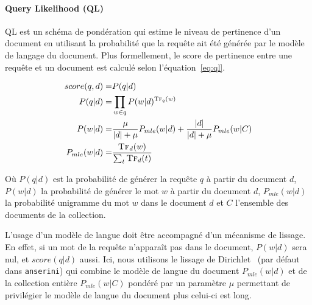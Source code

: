 \paragraph{Query Likelihood (QL)~\cite{ponte_language_1998}}
QL est un schéma de pondération qui estime le niveau de pertinence d'un document en utilisant la probabilité que la requête ait été générée par le modèle de langage du document. 
Plus formellement, le score de pertinence entre une requête et un document est calculé selon l'équation~\ref{eq:ql}.

\begin{align}
\begin{split}
    score(q, d) = & P(q|d) \\
    P(q|d) = & \prod_{w\in q} P(w|d)^{\textsc{Tf}_q(w)} \\
    P(w|d) = & \frac{\mu}{|d| + \mu} P_{mle}(w|d) + \frac{|d|}{|d| + \mu} P_{mle}(w|C) \\
    P_{mle}(w|d) = & \frac{\textsc{Tf}_d(w)}{\sum_t \textsc{Tf}_d(t)}
    \label{eq:ql}
\end{split}
\end{align}

Où $P(q|d)$ est la probabilité de générer la requête $q$ à partir du document $d$, $P(w|d)$ la probabilité de générer le mot $w$ à partir du document $d$, $P_{mle}(w|d)$ la probabilité unigramme du mot $w$ dans le document $d$ et $C$ l'ensemble des documents de la collection.

L'usage d'un modèle de langue doit être accompagné d'un mécanisme de lissage.
En effet, si un mot de la requête n'apparaît pas dans le document, $P(w|d)$ sera nul, et $score(q|d)$ aussi.
Ici, nous utilisons le lissage de Dirichlet~\cite{zhai_study_2017} (par défaut dans \texttt{anserini}) qui combine le modèle de langue du document $P_{mle}(w|d)$ et de la collection entière $P_{mle}(w|C)$ pondéré par un paramètre $\mu$ permettant de privilégier le modèle de langue du document plus celui-ci est long.

